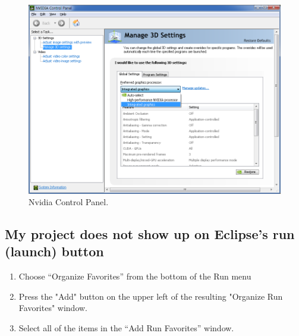 \documentclass[11pt]{article}
\begin{document}
\begin{figure}[h]
\begin{center}
\vspace{.2in}
\centerline {
\includegraphics[width=7in]{nvidia_control_panel.png}
}
\caption{Nvidia Control Panel.}
\label{fig:imp}
\end{center}
\end{figure}

\subsection{My project does not show up on Eclipse's run (launch) button}
\label{p:missing_project}

\begin{enumerate}
\item Choose ``Organize Favorites'' from the bottom of the Run menu 
\item Press the "Add" button on the upper left of the resulting "Organize Run Favorites" window. 
\item Select all of the items in the ``Add Run Favorites'' window.
\end{enumerate}
\end{document}
